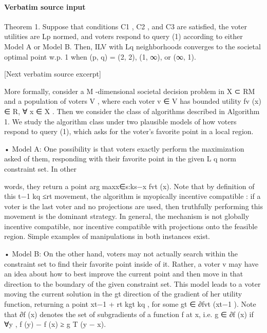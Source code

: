 \documentclass[10pt]{article}
\begin{document}
\paragraph{Verbatim source input}
\begin{ReviewVerbatim}
Theorem 1. Suppose that conditions C1 , C2 , and C3 are satisfied, the voter utilities are Lp
normed, and voters respond to query (1) according to either Model A or Model B. Then,
ILV with Lq neighborhoods converges to the societal optimal point w.p. 1 when (p, q) = (2, 2),
(1, ∞), or (∞, 1).

[Next verbatim source excerpt]

   More formally, consider a M -dimensional societal decision problem in X  ⊂ RM and a
population of voters V , where each voter v ∈ V has bounded utility fv (x) ∈ R, ∀ x ∈ X .
Then we consider the class of algorithms described in Algorithm 1. We study the algorithm
class under two plausible models of how voters respond to query (1), which asks for the
voter's favorite point in a local region.



• Model A:       One possibility is that voters exactly perform the maximization asked of
  them, responding with their favorite point in the given L
                                                                       q norm constraint set. In other

  words, they return a point arg maxx∈{s:ks−x                    fvt (x). Note that by definition of this
                                                  t−1 kq ≤rt }
  movement, the algorithm is     myopically incentive compatible : if a voter is the last voter
  and no projections are used, then truthfully performing this movement is the dominant
  strategy.   In general, the mechanism is not globally incentive compatible, nor incentive
  compatible with projections onto the feasible region. Simple examples of manipulations
  in both instances exist.



• Model B:       On the other hand, voters may not actually search within the constraint set
  to find their favorite point inside of it. Rather, a voter v may have an idea about how
  to best improve the current point and then move in that direction to the boundary of
  the given constraint set. This model leads to a voter moving the current solution in the
                                                                                           gt
  direction of the gradient of her utility function, returning a point xt−1 + rt
                                                                                         kgt kq , for some
  gt ∈ ∂fvt (xt−1 ). Note that ∂f (x) denotes the set of subgradients of a function f at x, i.e.
  g ∈ ∂f (x) if ∀y , f (y) − f (x) ≥ g T (y − x).


\end{ReviewVerbatim}
\end{document}
